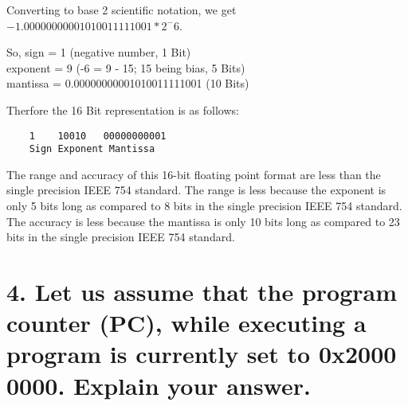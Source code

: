 \documentclass[11pt]{article}
\begin{document}
Converting to base 2 scientific notation, we get $-1.00000000001010011111001 * 2^-6$.

So, sign = 1 (negative number, 1 Bit) 
\\exponent = 9 (-6 = 9 - 15; 15 being bias, 5 Bits)
\\mantissa = 0.00000000001010011111001 (10 Bits)

Therfore the 16 Bit representation is as follows:
\begin{verbatim}
    1    10010   00000000001
    Sign Exponent Mantissa
\end{verbatim}

The range and accuracy of this 16-bit floating point format are less than the single precision IEEE 754 standard. The range is less because the exponent is only 5 bits long as compared to 8 bits in the single precision IEEE 754 standard. The accuracy is less because the mantissa is only 10 bits long as compared to 23 bits in the single precision IEEE 754 standard.

\newpage
\section*{4. Let us assume that the program counter (PC), while executing a program is currently set to 0x2000 0000. Explain your answer.}
\end{document}

